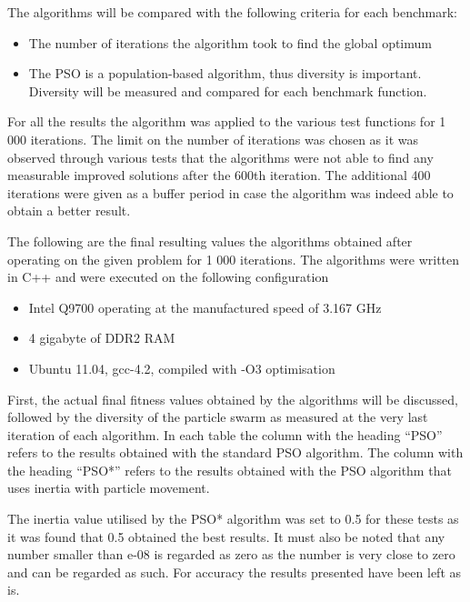 The algorithms will be compared with the following criteria for each benchmark:
\begin{itemize}
\item The number of iterations the algorithm took to find the global optimum
\item The PSO is a population-based algorithm, thus diversity is important. Diversity will be measured and compared for each benchmark function.
\end{itemize}
For all the results the algorithm was applied to the various test functions for 1 000 iterations. The limit on the number of iterations was chosen as it was observed through various tests that the algorithms were not able to find any measurable improved solutions after the 600th iteration. The additional 400 iterations were given as a buffer period in case the algorithm was indeed able to obtain a better result.

The following are the final resulting values the algorithms obtained after operating on the given problem for 1 000 iterations. The algorithms were written in C++ and were executed on the following configuration
\begin{itemize}
\item Intel Q9700 operating at the manufactured speed of 3.167 GHz
\item 4 gigabyte of DDR2 RAM
\item Ubuntu 11.04, gcc-4.2, compiled with -O3 optimisation
\end{itemize}

First, the actual final fitness values obtained by the algorithms will be discussed, followed by the diversity of the particle swarm as measured at the very last iteration of each algorithm. In each table the column with the heading ``PSO'' refers to the results obtained with the standard PSO algorithm. The column with the heading ``PSO*'' refers to the results obtained with the PSO algorithm that uses inertia with particle movement. 

The inertia value utilised by the PSO* algorithm was set to 0.5 for these tests as it was found that 0.5 obtained the best results. It must also be noted that any number smaller than e-08 is regarded as zero as the number is very close to zero and can be regarded as such. For accuracy the results presented have been left as is.
